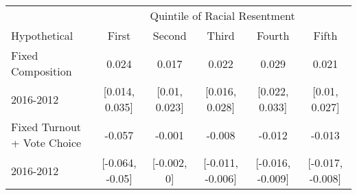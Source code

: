 \begin{tabular}{l|ccccc}
\hline\hline
              & \multicolumn{5}{c}{Quintile of Racial Resentment} \\
Hypothetical  & First & Second & Third & Fourth & Fifth\\
\hline
Fixed Composition  &  0.024 & 0.017 & 0.022 & 0.029 & 0.021 \\ 
 2016-2012 & [0.014, 0.035] & [0.01, 0.023] & [0.016, 0.028] & [0.022, 0.033] & [0.01, 0.027] \\ 
 \hline
Fixed Turnout + Vote Choice  &  -0.057 & -0.001 & -0.008 & -0.012 & -0.013 \\ 
 2016-2012 & [-0.064, -0.05] & [-0.002, 0] & [-0.011, -0.006] & [-0.016, -0.009] & [-0.017, -0.008] \\ 
 \hline
\hline
\end{tabular}
